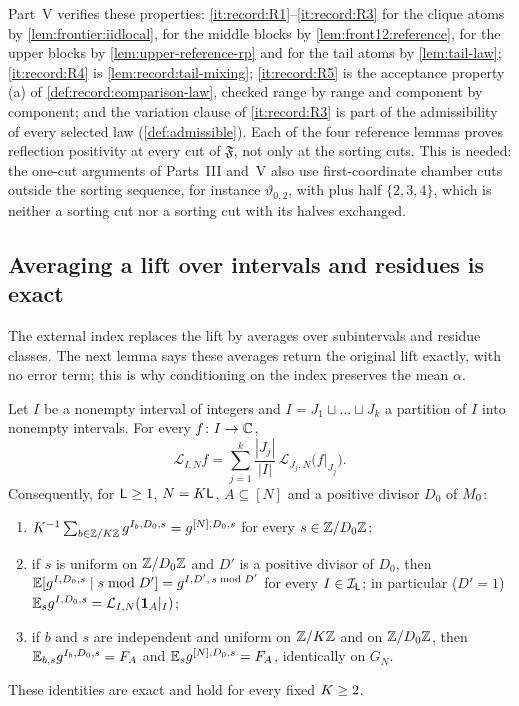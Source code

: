 Part~V verifies these properties: \ref{it:record:R1}--\ref{it:record:R3} for
the clique atoms by \cref{lem:frontier:iidlocal}, for the middle blocks by
\cref{lem:front12:reference}, for the upper blocks by
\cref{lem:upper-reference-rp} and for the tail atoms by \cref{lem:tail-law};
\ref{it:record:R4} is \cref{lem:record:tail-mixing}; \ref{it:record:R5} is the
acceptance property (a) of \cref{def:record:comparison-law}, checked range by
range and component by component; and the variation clause of \ref{it:record:R3} is part of the
admissibility of every selected law (\cref{def:admissible}). Each of the four
reference lemmas proves reflection positivity at every cut of $\mathfrak F$,
not only at the sorting cuts. This is needed: the one-cut arguments of
Parts~III and~V also use first-coordinate chamber cuts outside the sorting
sequence, for instance $\vartheta_{0,2}$, with plus half $\{2,3,4\}$, which is
neither a sorting cut nor a sorting cut with its halves exchanged.

\subsection{Averaging a lift over intervals and residues is exact}\label{subsec:lifts:index}

The external index replaces the lift by averages over subintervals
and residue classes. The next lemma says these averages return the
original lift exactly, with no error term; this is why conditioning
on the index preserves the mean $\alpha$.

\begin{lemma}\label{lem:twointerval}
Let $I$ be a nonempty interval of integers and $I=J_1\sqcup\dots\sqcup J_k$ a
partition of $I$ into nonempty intervals. For every $f\colon I\to\mathbb C$,
\[
 \mathcal L_{I,N}f=\sum_{j=1}^k\frac{|J_j|}{|I|}\,\mathcal L_{J_j,N}\big(f|_{J_j}\big).
\]
Consequently, for $\mathsf L\ge1$, $N=K\mathsf L$, $A\subseteq[N]$ and a positive
divisor $D_0$ of $M_0$:
\begin{enumerate}[label=\textup{(\roman*)}]
\item\label{it:ti:intervals}
 $K^{-1}\sum_{b\in\mathbb Z/K\mathbb Z}g^{I_b,D_0,s}=g^{[N],D_0,s}$ for every
 $s\in\mathbb Z/D_0\mathbb Z$;
\item\label{it:ti:residues} if $s$ is uniform on $\mathbb Z/D_0\mathbb Z$ and $D'$ is a
 positive divisor of $D_0$, then
 $\mathbb E[g^{I,D_0,s}\mid s\bmod D']=g^{I,D',\,s\bmod D'}$ for every
 $I\in\mathcal I_\mathsf L$; in particular ($D'=1$)
 $\mathbb E_sg^{I,D_0,s}=\mathcal L_{I,N}(\mathbf 1_A|_I)$;
\item\label{it:ti:mean} if $b$ and $s$ are independent and uniform on
 $\mathbb Z/K\mathbb Z$ and on $\mathbb Z/D_0\mathbb Z$, then $\mathbb E_{b,s}g^{I_b,D_0,s}=F_A$ and
 $\mathbb E_sg^{[N],D_0,s}=F_A$, identically on $G_N$.
\end{enumerate}
These identities are exact and hold for every fixed $K\ge2$.
\end{lemma}

